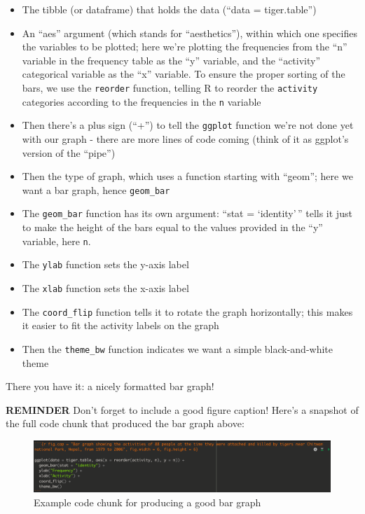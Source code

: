 \documentclass[
]{book}
\providecommand{\tightlist}{%
  \setlength{\itemsep}{0pt}\setlength{\parskip}{0pt}}
\begin{document}
\begin{itemize}
\tightlist
\item
  The tibble (or dataframe) that holds the data (``data = tiger.table'')
\item
  An ``aes'' argument (which stands for ``aesthetics''), within which one specifies the variables to be plotted; here we're plotting the frequencies from the ``n'' variable in the frequency table as the ``y'' variable, and the ``activity'' categorical variable as the ``x'' variable. To ensure the proper sorting of the bars, we use the \texttt{reorder} function, telling R to reorder the \texttt{activity} categories according to the frequencies in the \texttt{n} variable
\item
  Then there's a plus sign (``+'') to tell the \texttt{ggplot} function we're not done yet with our graph - there are more lines of code coming (think of it as ggplot's version of the ``pipe'')
\item
  Then the type of graph, which uses a function starting with ``geom''; here we want a bar graph, hence \texttt{geom\_bar}
\item
  The \texttt{geom\_bar} function has its own argument: ``stat = `identity'\,'' tells it just to make the height of the bars equal to the values provided in the ``y'' variable, here \texttt{n}.
\item
  The \texttt{ylab} function sets the y-axis label
\item
  The \texttt{xlab} function sets the x-axis label
\item
  The \texttt{coord\_flip} function tells it to rotate the graph horizontally; this makes it easier to fit the activity labels on the graph
\item
  Then the \texttt{theme\_bw} function indicates we want a simple black-and-white theme
\end{itemize}

There you have it: a nicely formatted bar graph!

\textbf{REMINDER} Don't forget to include a good figure caption! Here's a snapshot of the full code chunk that produced the bar graph above:

\begin{figure}
\includegraphics[width=32.69in]{./more/bar_graph_chunk} \caption{Example code chunk for producing a good bar graph}\label{fig:unnamed-chunk-28}
\end{figure}
\end{document}

